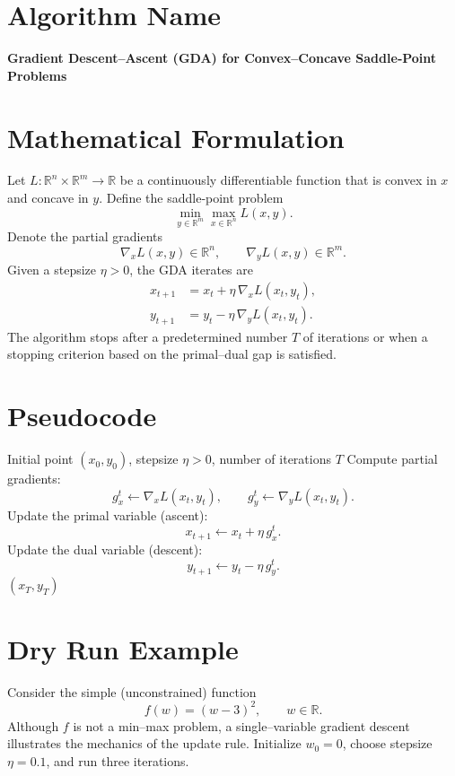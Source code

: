 \documentclass[11pt]{article}
\begin{document}
\section*{Algorithm Name}
\textbf{Gradient Descent–Ascent (GDA) for Convex--Concave Saddle‑Point Problems}

\section*{Mathematical Formulation}
Let $L:\mathbb{R}^{n}\times\mathbb{R}^{m}\rightarrow\mathbb{R}$ be a continuously differentiable function that is convex in $x$ and concave in $y$. Define the saddle‑point problem
\[
\min_{y\in\mathbb{R}^{m}}\max_{x\in\mathbb{R}^{n}} L(x,y).
\]
Denote the partial gradients
\[
\nabla_{x}L(x,y)\in\mathbb{R}^{n},\qquad 
\nabla_{y}L(x,y)\in\mathbb{R}^{m}.
\]
Given a stepsize $\eta>0$, the GDA iterates are
\begin{align}
x_{t+1} &= x_{t} + \eta\,\nabla_{x}L(x_{t},y_{t}) ,\label{eq:update-x}\\
y_{t+1} &= y_{t} - \eta\,\nabla_{y}L(x_{t},y_{t}) .\label{eq:update-y}
\end{align}
The algorithm stops after a predetermined number $T$ of iterations or when a stopping criterion based on the primal–dual gap is satisfied.

\section*{Pseudocode}
\begin{algorithm}[H]
\caption{Gradient Descent–Ascent (GDA)}\label{alg:gda}
\begin{algorithmic}[1]
\Require Initial point $(x_{0},y_{0})$, stepsize $\eta>0$, number of iterations $T$
    \State Compute partial gradients:
    \[
    g_{x}^{t}\gets \nabla_{x}L(x_{t},y_{t}),\qquad 
    g_{y}^{t}\gets \nabla_{y}L(x_{t},y_{t}).
    \]
    \State Update the primal variable (ascent):
    \[
    x_{t+1}\gets x_{t}+ \eta\, g_{x}^{t}.
    \]
    \State Update the dual variable (descent):
    \[
    y_{t+1}\gets y_{t}- \eta\, g_{y}^{t}.
    \]
\EndFor
\State \Return $(x_{T},y_{T})$
\end{algorithmic}
\end{algorithm}

\section*{Dry Run Example}
Consider the simple (unconstrained) function
\[
f(w)=(w-3)^{2},\qquad w\in\mathbb{R}.
\]
Although $f$ is not a min–max problem, a single–variable gradient descent illustrates the mechanics of the update rule.  
Initialize $w_{0}=0$, choose stepsize $\eta=0.1$, and run three iterations.
\end{document}
